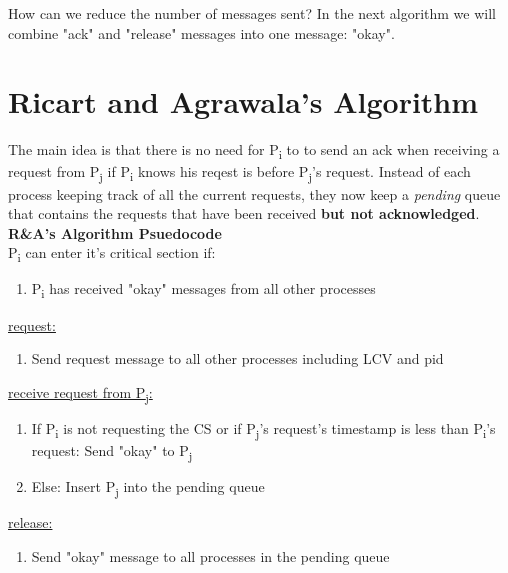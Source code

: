 \documentclass[twoside]{article}
\begin{document}
How can we reduce the number of messages sent? In the next algorithm we will combine "ack" and "release" messages into
one message: "okay".


\section{Ricart and Agrawala's Algorithm}
The main idea is that there is no need for P\textsubscript{i} to to send an ack when receiving a request from
P\textsubscript{j} if P\textsubscript{i} knows his reqest is before P\textsubscript{j}'s request.
Instead of each process keeping track of all the current requests, they now keep a \textit{pending} queue that contains
the requests that have been received \textbf{but not acknowledged}. \\

\textbf{R\&A's Algorithm Psuedocode} \\
P\textsubscript{i} can enter it's critical section if:
\begin{enumerate}
    \item P\textsubscript{i} has received "okay" messages from all other processes
\end{enumerate}
\underline{request:}
\begin{enumerate}
    \item Send request message to all other processes including LCV and pid
\end{enumerate}
\underline{receive request from P\textsubscript{j}:}
\begin{enumerate}
    \item If P\textsubscript{i} is not requesting the CS or if P\textsubscript{j}'s request's timestamp is less than
    P\textsubscript{i}'s request: Send "okay" to P\textsubscript{j}
    \item Else: Insert P\textsubscript{j} into the pending queue
\end{enumerate}
\underline{release:}
\begin{enumerate}
    \item Send "okay" message to all processes in the pending queue
\end{enumerate}
\end{document}
